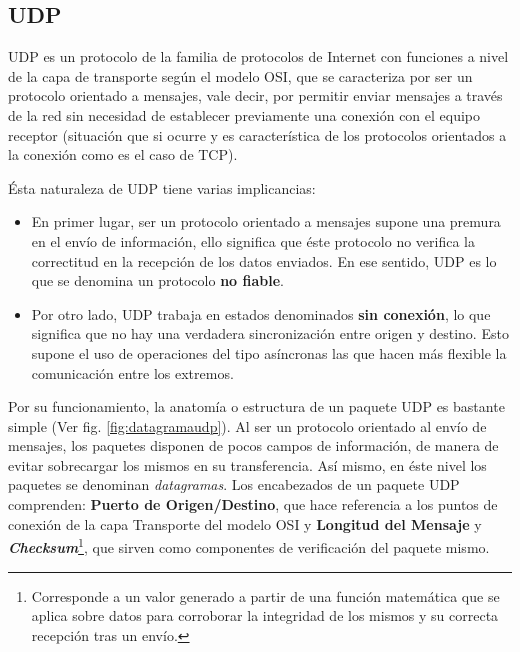 \begin{intro}
\subsection*{UDP}
UDP \cite{rfc:768} es un protocolo de la familia de protocolos de Internet con funciones a nivel de la capa de transporte según el modelo OSI, que se caracteriza por ser un protocolo orientado a mensajes, vale decir, por permitir enviar mensajes a través de la red sin necesidad de establecer previamente una conexión con el equipo receptor (situación que si ocurre y es característica de los protocolos orientados a la conexión como es el caso de TCP).

Ésta naturaleza de UDP tiene varias implicancias:
\begin{itemize}
\item En primer lugar, ser un protocolo orientado a mensajes supone una premura en el envío de información, ello significa que éste protocolo no verifica la correctitud en la recepción de los datos enviados. En ese sentido, UDP es lo que se denomina un protocolo \textbf{no fiable}.
\item Por otro lado, UDP trabaja en estados denominados \textbf{sin conexión}, lo que significa que no hay una verdadera sincronización entre origen y destino. Esto supone el uso de operaciones del tipo asíncronas las que hacen más flexible la comunicación entre los extremos.
\end{itemize}

Por su funcionamiento, la anatomía o estructura de un paquete UDP es bastante simple (Ver fig. \ref{fig:datagramaudp}). Al ser un protocolo orientado al envío de mensajes, los paquetes disponen de pocos campos de información, de manera de evitar sobrecargar los mismos en su transferencia. Así mismo, en éste nivel los paquetes se denominan \emph{datagramas}. Los encabezados de un paquete UDP comprenden: \textbf{Puerto de Origen/Destino}, que hace referencia a los puntos de conexión de la capa Transporte del modelo OSI y \textbf{Longitud del Mensaje} y \textbf{\emph{Checksum}}\footnote{Corresponde a un valor generado a partir de una función matemática que se aplica sobre datos para corroborar la integridad de los mismos y su correcta recepción tras un envío.}, que sirven como componentes de verificación del paquete mismo.


\end{intro}
